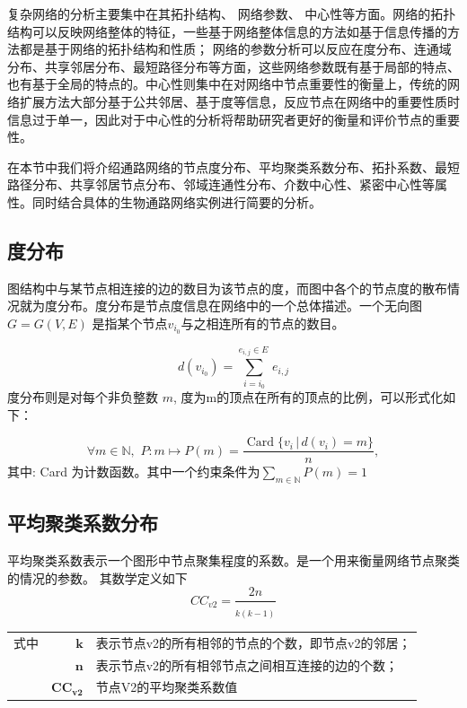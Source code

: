 复杂网络的分析主要集中在其拓扑结构、 网络参数、 中心性等方面。网络的拓扑结构可以反映网络整体的特征，一些基于网络整体信息的方法如基于信息传播的方法\cite{emig2013drug}都是基于网络的拓扑结构和性质； 网络的参数分析可以反应在度分布、连通域分布、共享邻居分布、最短路径分布等方面，这些网络参数既有基于局部的特点、也有基于全局的特点的。中心性则集中在对网络中节点重要性的衡量上，传统的网络扩展方法大部分基于公共邻居、基于度\cite{lu2011link}等信息，反应节点在网络中的重要性质时信息过于单一，因此对于中心性的分析将帮助研究者更好的衡量和评价节点的重要性。

在本节中我们将介绍通路网络的节点度分布、平均聚类系数分布、拓扑系数、最短路径分布、共享邻居节点分布、邻域连通性分布、介数中心性、紧密中心性等属性。同时结合具体的生物通路网络实例进行简要的分析。

\subsection{度分布}
图结构中与某节点相连接的边的数目为该节点的度，而图中各个的节点度的散布情况就为度分布。度分布是节点度信息在网络中的一个总体描述。一个无向图 ${\displaystyle G=G(V,E)}$ 是指某个节点$ {\displaystyle v_{i_{0}}}$与之相连所有的节点的数目。

\begin{equation}\label{eq22}
	d( v_{i_{0}}) =\sum\limits ^{e_{i,j} \in E\ }_{i=i_{0}} e_{i,j}
\end{equation}
度分布则是对每个非负整数 ${\displaystyle m}$, 度为m的顶点在所有的顶点的比例，可以形式化如下：

\begin{equation}\label{eq23}
{\displaystyle \forall m\in \mathbb {N} ,\,\,P:m\mapsto P(m)={\frac {\operatorname {Card} \{v_{i}\,|\,d(v_{i})=m\}}{n}},}
\end{equation}
其中: Card 为计数函数。其中一个约束条件为$ {\displaystyle \sum _{m\in \mathbb {N} }P(m)=1}$

\subsection{平均聚类系数分布}
平均聚类系数表示一个图形中节点聚集程度的系数。是一个用来衡量网络节点聚类的情况的参数。 其数学定义如下
\begin{equation}\label{eq24}
CC_{v2} =\frac{2n}{_{k( k-1)}}
\end{equation}
\begin{tabularx}{\textwidth}{@{}l@{\quad}r@{———}X@{}}
式中 & $\boldsymbol{k}$ &  表示节点v2的所有相邻的节点的个数，即节点v2的邻居；\\
	& $\boldsymbol{n}$ &   表示节点v2的所有相邻节点之间相互连接的边的个数；\\
	& $\boldsymbol{CC_{v2}}$ &	节点V2的平均聚类系数值 \\
\end{tabularx}\vspace{3.15bp}


